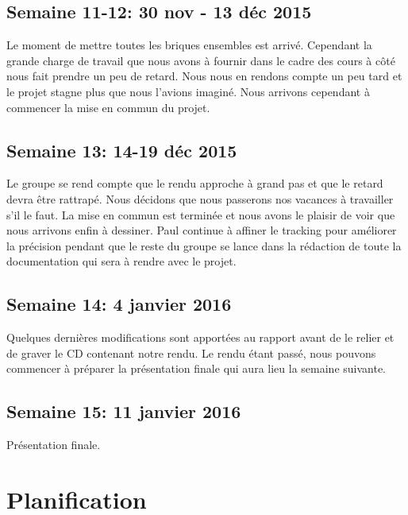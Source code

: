 \documentclass[11pt,a4paper,oldfontcommands]{memoir}
\begin{document}
\section{Semaine 11-12: 30 nov - 13 déc 2015}

Le moment de mettre toutes les briques ensembles est arrivé. Cependant la grande charge de travail que nous avons à fournir dans le cadre des cours à côté nous fait prendre un peu de retard. Nous nous en rendons compte un peu tard et le projet stagne plus que nous l'avions imaginé. Nous arrivons cependant à commencer la mise en commun du projet.

\section{Semaine 13: 14-19 déc 2015}

Le groupe se rend compte que le rendu approche à grand pas et que le retard devra être rattrapé. Nous décidons que nous passerons nos vacances à travailler s'il le faut. La mise en commun est terminée et nous avons le plaisir de voir que nous arrivons enfin à dessiner. Paul continue à affiner le tracking pour améliorer la précision pendant que le reste du groupe se lance dans la rédaction de toute la documentation qui sera à rendre avec le projet. 

\section{Semaine 14: 4 janvier 2016}

Quelques dernières modifications sont apportées au rapport avant de le relier et de graver le CD contenant notre rendu. Le rendu étant passé, nous pouvons commencer à préparer la présentation finale qui aura lieu la semaine suivante. 

\section{Semaine 15: 11 janvier 2016}

Présentation finale.


\chapter{Planification}
\end{document}
